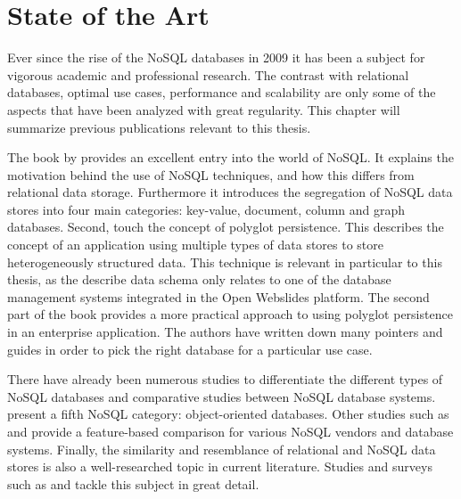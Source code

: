 \chapter{State of the Art}
\label{ch:state-of-the-art}

Ever since the rise of the NoSQL databases in 2009 \autocite{Sadalage2012} it has been a subject for vigorous academic and professional research.
The contrast with relational databases, optimal use cases, performance and scalability are only some of the aspects that have been analyzed with great regularity.
This chapter will summarize previous publications relevant to this thesis.


The book by \textcite{Sadalage2012} provides an excellent entry into the world of NoSQL.
It explains the motivation behind the use of NoSQL techniques, and how this differs from relational data storage.
Furthermore it introduces the segregation of NoSQL data stores into four main categories: key-value, document, column and graph databases.
Second, \citeauthor{Sadalage2012} touch the concept of polyglot persistence.
This describes the concept of an application using multiple types of data stores to store heterogeneously structured data.
This technique is relevant in particular to this thesis, as the describe data schema only relates to one of the database management systems integrated in the Open Webslides platform.
The second part of the book provides a more practical approach to using polyglot persistence in an enterprise application.
The authors have written down many pointers and guides in order to pick the right database for a particular use case.

There have already been numerous studies to differentiate the different types of NoSQL databases and comparative studies between NoSQL database systems.
\textcite{Nayak2013} present a fifth NoSQL category: object-oriented databases.
Other studies such as \textcite{Moniruzzaman2013} and \textcite{Maroo2013} provide a feature-based comparison for various NoSQL vendors and database systems.
Finally, the similarity and resemblance of relational and NoSQL data stores is also a well-researched topic in current literature.
Studies and surveys such as \textcite{Mohamed2014} and \textcite{Cattell2010} tackle this subject in great detail.

